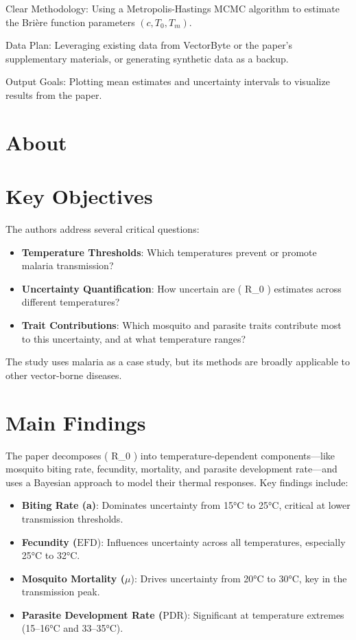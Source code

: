 \documentclass[
  letterpaper,
  DIV=11,
  numbers=noendperiod]{scrreprt}
\providecommand{\tightlist}{%
  \setlength{\itemsep}{0pt}\setlength{\parskip}{0pt}}
\begin{document}
Clear Methodology: Using a Metropolis-Hastings MCMC algorithm to
estimate the Brière function parameters \((c, T_0, T_m)\).

Data Plan: Leveraging existing data from VectorByte or the paper's
supplementary materials, or generating synthetic data as a backup.

Output Goals: Plotting mean estimates and uncertainty intervals to
visualize results from the paper.


\chapter{About}\label{about}


\chapter{Key Objectives}\label{key-objectives}

The authors address several critical questions:

\begin{itemize}
\tightlist
\item
  \textbf{Temperature Thresholds}: Which temperatures prevent or promote
  malaria transmission?
\item
  \textbf{Uncertainty Quantification}: How uncertain are ( R\_0 )
  estimates across different temperatures?
\item
  \textbf{Trait Contributions}: Which mosquito and parasite traits
  contribute most to this uncertainty, and at what temperature ranges?
\end{itemize}

The study uses malaria as a case study, but its methods are broadly
applicable to other vector-borne diseases.


\chapter{Main Findings}\label{main-findings}

The paper decomposes ( R\_0 ) into temperature-dependent
components---like mosquito biting rate, fecundity, mortality, and
parasite development rate---and uses a Bayesian approach to model their
thermal responses. Key findings include:

\begin{itemize}
\tightlist
\item
  \textbf{Biting Rate (a)}: Dominates uncertainty from 15°C to 25°C,
  critical at lower transmission thresholds.
\item
  \textbf{Fecundity (}\(\text{EFD}\)): Influences uncertainty across all
  temperatures, especially 25°C to 32°C.
\item
  \textbf{Mosquito Mortality (}\(\mu\)): Drives uncertainty from 20°C to
  30°C, key in the transmission peak.
\item
  \textbf{Parasite Development Rate (}\(\text{PDR}\)): Significant at
  temperature extremes (15--16°C and 33--35°C).
\end{itemize}
\end{document}
